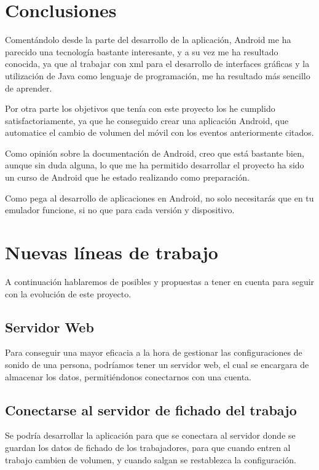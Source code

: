 
\section{Conclusiones}
Comentándolo desde la parte del desarrollo de la aplicación, Android me ha parecido una tecnología bastante interesante, y a su vez me ha resultado conocida, ya que al trabajar con xml para el desarrollo de interfaces gráficas y la utilización de Java como lenguaje de programación, me ha resultado más sencillo de aprender.

Por otra parte los objetivos que tenía con este proyecto los he cumplido satisfactoriamente, ya que he conseguido crear una aplicación Android, que automatice el cambio de volumen del móvil con los eventos anteriormente citados.

Como opinión sobre la documentación de Android, creo que está bastante bien, aunque sin duda alguna, lo que me ha permitido desarrollar el proyecto ha sido un curso de Android que he estado realizando como preparación.

Como pega al desarrollo de aplicaciones en Android, no solo necesitarás que en tu emulador funcione, si no que para cada versión y dispositivo.

\section{Nuevas líneas de trabajo}

A continuación hablaremos de posibles y propuestas a tener en cuenta para seguir con la evolución de este proyecto.

\subsection{Servidor Web}
Para conseguir una mayor eficacia a la hora de gestionar las configuraciones de sonido de una persona, podríamos tener un servidor web, el cual se encargara de almacenar los datos, permitiéndonos conectarnos con una cuenta.

\subsection{Conectarse al servidor de fichado del trabajo}

Se podría desarrollar la aplicación para que se conectara al servidor donde se guardan los datos de fichado de los trabajadores, para que cuando entren al trabajo cambien de volumen, y cuando salgan se restablezca la configuración.

